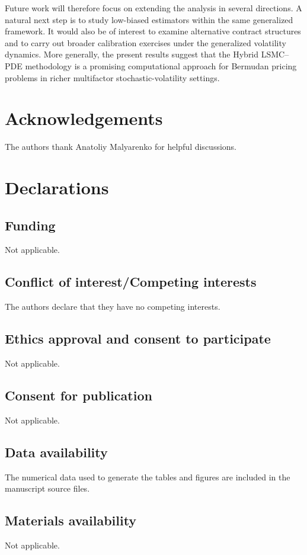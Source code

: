 \documentclass[10pt]{article}
\theoremstyle{plain}
\theoremstyle{definition}
\theoremstyle{remark}
\begin{document}
Future work will therefore focus on extending the analysis in several directions. A natural next step is to study low-biased estimators within the same generalized framework. It would also be of interest to examine alternative contract structures and to carry out broader calibration exercises under the generalized volatility dynamics. More generally, the present results suggest that the Hybrid LSMC--PDE methodology is a promising computational approach for Bermudan pricing problems in richer multifactor stochastic-volatility settings.



\section*{Acknowledgements}
The authors thank Anatoliy Malyarenko for helpful discussions.

\section*{Declarations}

\subsection*{Funding}
Not applicable.

\subsection*{Conflict of interest/Competing interests}
The authors declare that they have no competing interests.

\subsection*{Ethics approval and consent to participate}
Not applicable.

\subsection*{Consent for publication}
Not applicable.

\subsection*{Data availability}
The numerical data used to generate the tables and figures are included in the manuscript source files.

\subsection*{Materials availability}
Not applicable.
\end{document}
